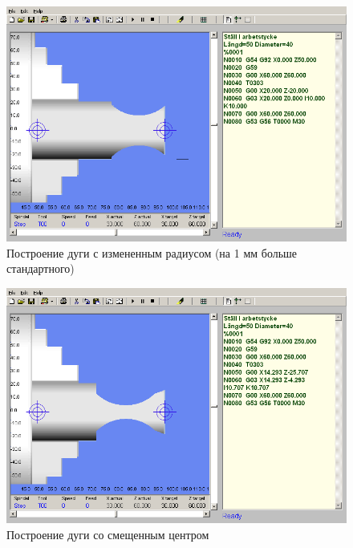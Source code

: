 \begin{figure}[ht]
\centering
	\includegraphics[width=.9\linewidth]{2.png}
    \caption{Построение дуги с измененным радиусом (на 1 мм больше стандартного)\label{fig:changed}}
\end{figure}

\begin{figure}[ht]
\centering
	\includegraphics[width=.9\linewidth]{3.png}
    \caption{Построение дуги со смещенным центром\label{fig:changedcenter}}
\end{figure}

\clearpage

